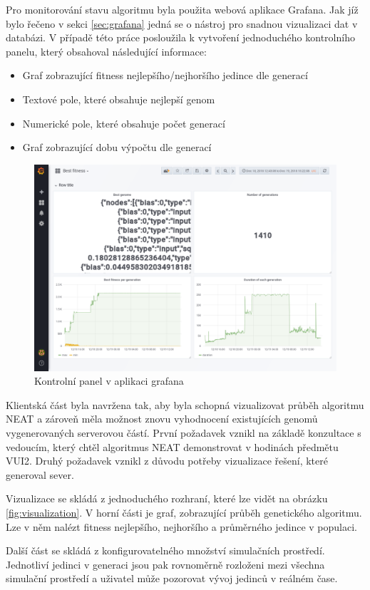 Pro monitorování stavu algoritmu byla použita webová aplikace Grafana. Jak jíž bylo řečeno v sekci \ref{sec:grafana} jedná se o nástroj pro snadnou vizualizaci dat v databázi. V případě této práce posloužila k vytvoření jednoduchého kontrolního panelu, který obsahoval následující informace:
\begin{itemize}
	\item Graf zobrazující fitness nejlepšího/nejhoršího jedince dle generací
	\item Textové pole, které obsahuje nejlepší genom
	\item Numerické pole, které obsahuje počet generací
	\item Graf zobrazující dobu výpočtu dle generací
\end{itemize}
\begin{figure}[H]
	\centering
	\includegraphics[width=0.7\linewidth]{grafana}
	\caption{Kontrolní panel v aplikaci grafana}
	\label{fig:grafana}
\end{figure}

Klientská část byla navržena tak, aby byla schopná vizualizovat průběh algoritmu NEAT a zároveň měla možnost znovu vyhodnocení existujících genomů vygenerovaných serverovou částí. První požadavek vznikl na základě konzultace s vedoucím, který chtěl algoritmus NEAT demonstrovat v hodinách předmětu VUI2. Druhý požadavek vznikl z důvodu potřeby vizualizace řešení, které generoval sever.

Vizualizace se skládá z jednoduchého rozhraní, které lze vidět na obrázku \ref{fig:visualization}. V horní části je graf, zobrazující průběh genetického algoritmu. Lze v něm nalézt fitness nejlepšího, nejhoršího a průměrného jedince v populaci.

Další část se skládá z konfigurovatelného množství simulačních prostředí. Jednotliví jedinci v generaci jsou pak rovnoměrně rozloženi mezi všechna simulační prostředí a uživatel může pozorovat vývoj jedinců v reálném čase.

